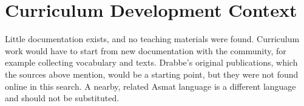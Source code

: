 \documentclass[12pt]{article}
\begin{document}
\section{Curriculum Development Context}
Little documentation exists, and no teaching materials were found. Curriculum work would have to start from new documentation with the community, for example collecting vocabulary and texts. Drabbe's original publications, which the sources above mention, would be a starting point, but they were not found online in this search. A nearby, related Asmat language is a different language and should not be substituted.
\end{document}
